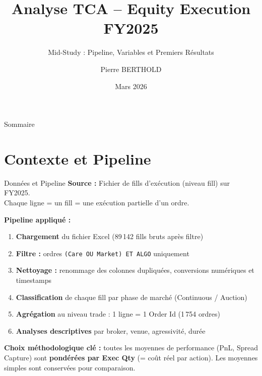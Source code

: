 \documentclass[10pt]{beamer}
\title{Analyse TCA -- Equity Execution FY2025}
\subtitle{Mid-Study : Pipeline, Variables et Premiers Résultats}
\author{Pierre BERTHOLD}
\date{Mars 2026}
\begin{document}
\begin{frame}
\titlepage
\end{frame}

\begin{frame}{Sommaire}
\tableofcontents
\end{frame}

\section{Contexte et Pipeline}

\begin{frame}{Données et Pipeline}
\textbf{Source :} Fichier de fills d'exécution (niveau fill) sur FY2025.\\
Chaque ligne = un fill = une exécution partielle d'un ordre.

\vspace{0.3cm}
\textbf{Pipeline appliqué :}
\begin{enumerate}
    \item \textbf{Chargement} du fichier Excel (89\,142 fills bruts après filtre)
    \item \textbf{Filtre :} ordres \texttt{(Care OU Market) ET ALGO} uniquement
    \item \textbf{Nettoyage :} renommage des colonnes dupliquées, conversions numériques et timestamps
    \item \textbf{Classification} de chaque fill par phase de marché (Continuous / Auction)
    \item \textbf{Agrégation} au niveau trade : 1 ligne = 1 Order Id (1\,754 ordres)
    \item \textbf{Analyses descriptives} par broker, venue, agressivité, durée
\end{enumerate}

\vspace{0.3cm}
\textbf{Choix méthodologique clé :} toutes les moyennes de performance (PnL, Spread Capture) sont \textbf{pondérées par Exec Qty} (= coût réel par action). Les moyennes simples sont conservées pour comparaison.
\end{frame}
\end{document}

